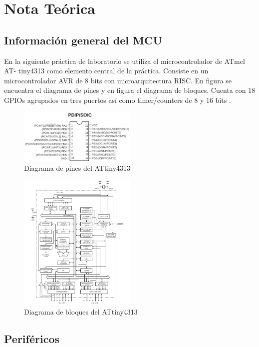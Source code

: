 \section{Nota Teórica}
\subsection{Información general del MCU}
En la siguiente práctica de laboratorio se utiliza el microcontrolador de ATmel AT-
tiny4313 como elemento central de la práctica. Consiste en un microcontrolador AVR de 8 bits con microarquitectura RISC. En figura \label{pines} se encuentra el diagrama de pines y en figura \cite{bloques} el diagrama de bloques. Cuenta con 18 GPIOs agrupados en tres puertos así como timer/counters de 8 y 16 bits \cite{presentacion}.
\begin{figure}[H]
    \centering
    \includegraphics[width=0.5\textwidth]{images/pines.png}
    \caption{Diagrama de pines del ATtiny4313 \cite{datasheet}}
    \label{pines}
\end{figure}

\begin{figure}[H]
    \centering
    \includegraphics[width=0.5\textwidth]{images/bloques.png}
    \caption{Diagrama de bloques del ATtiny4313 \cite{datasheet}}
    \label{bloques}
\end{figure}

\subsection{Periféricos}

